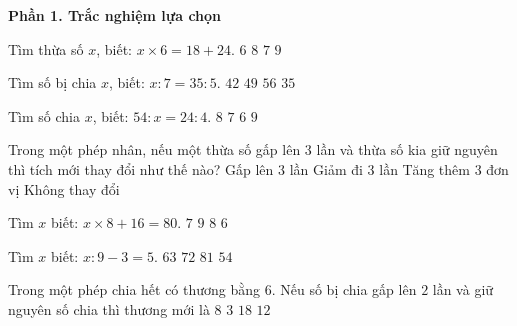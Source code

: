 \textbf{Phần 1. Trắc nghiệm lựa chọn}

\begin{ex} %
Tìm thừa số $x$, biết: $x \times 6 = 18 + 24$.
\choice
{$6$}
{$8$}
{\True $7$}
{$9$}
\end{ex}

\begin{ex} %
Tìm số bị chia $x$, biết: $x : 7 = 35 : 5$.
\choice
{$42$}
{\True $49$}
{$56$}
{$35$}
\end{ex}

\begin{ex} %
Tìm số chia $x$, biết: $54 : x = 24 : 4$.
\choice
{$8$}
{$7$}
{$6$}
{\True $9$}
\end{ex}

\begin{ex} %
Trong một phép nhân, nếu một thừa số gấp lên $3$ lần và thừa số kia giữ nguyên thì tích mới thay đổi như thế nào?
\choice
{\True Gấp lên $3$ lần}
{Giảm đi $3$ lần}
{Tăng thêm $3$ đơn vị}
{Không thay đổi}
\end{ex}

\begin{ex} %
Tìm $x$ biết: $x \times 8 + 16 = 80$.
\choice
{$7$}
{$9$}
{\True $8$}
{$6$}
\end{ex}

\begin{ex} %
Tìm $x$ biết: $x : 9 - 3 = 5$.
\choice
{$63$}
{\True $72$}
{$81$}
{$54$}
\end{ex}

\begin{ex} %
Trong một phép chia hết có thương bằng $6$. Nếu số bị chia gấp lên $2$ lần và giữ nguyên số chia thì thương mới là
\choice
{$8$}
{$3$}
{$18$}
{\True $12$}
\end{ex}

